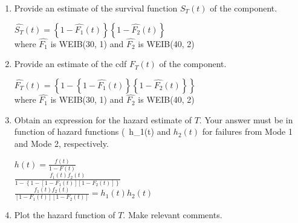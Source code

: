 \documentclass{article}
\begin{document}
\begin{enumerate}
  \begin{enumerate}
  \item Provide an estimate of the survival function \(S_T(t)\) of the component.\\
    \begin{center}
      \(\hat{S_T}(t) = \left\{1 - \hat{F_1}(t)\right\}\left\{1 - \hat{F_2}(t)\right\} \)\\
        
        where \(\hat{F_1} \) is WEIB(30, 1) and \(\hat{F_2} \) is WEIB(40, 2)\\
    \end{center}
    \vspace{0.5cm}
  \item Provide an estimate of the cdf \(F_T(t)\) of the component.\\
    \begin{center}
      \(\hat{F_T}(t) = \left\{1 - \left\{1 - \hat{F_1}(t)\right\}\left\{1 - \hat{F_2}(t)\right\}\right\} \)\\
      
      where \(\hat{F_1} \) is WEIB(30, 1) and \(\hat{F_2} \) is WEIB(40, 2)\\
    \end{center}
\pagebreak
  \item Obtain an expression for the hazard estimate of \(T \). Your answer must be in function of hazard functions (\ h_1(t) \) and \(h_2(t) \) for failures from Mode 1 and Mode 2, respectively.\\

  \begin{center}
    \large\(h(t) = \frac{f(t)}{1 - F(t)}\)\\
      \vspace{1cm}
    \(\frac{f_1(t)f_2(t)}{1-\left\{1 - [1 - F_1(t)][1 - F_2(t)]\right\}} \)\\
      \vspace{1cm}
    \(\frac{f_1(t)f_2(t)}{[1 - F_1(t)][1 - F_2(t)]} = h_1(t)h_2(t) \)\\
  \end{center}

\vspace{3in}
  \item Plot the hazard function of \(T \). Make relevant comments.\\


\end{enumerate}
\end{enumerate}
\end{document}
